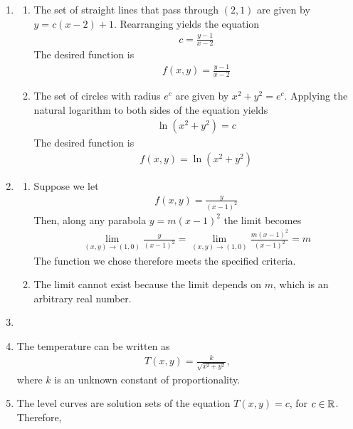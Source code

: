 \documentclass{article}
\begin{document}
\begin{enumerate}
\begin{enumerate}
\end{enumerate}
\item
\begin{enumerate}
\item The set of straight lines that pass through $(2,1)$ are given by $y = c(x-2) + 1$. Rearranging yields the equation 
\begin{align*}
c = \frac{y-1}{x-2}
\end{align*}
The desired function is 
\begin{align*}
f(x,y) = \frac{y-1}{x-2}
\end{align*}
\item The set of circles with radius $e^c$ are given by $x^2 + y^2 = e^c$. Applying the natural logarithm to both sides of the equation yields 
\begin{align*}
\ln(x^2+y^2) = c
\end{align*}
The desired function is 
\begin{align*}
f(x,y) =\ln(x^2+y^2)
\end{align*}\end{enumerate}
\item 
\begin{enumerate}
\item
Suppose we let 
\begin{align*}
f(x,y) = \frac{y}{(x-1)^2}
\end{align*}
Then, along any parabola $y = m(x-1)^2$ the limit becomes
\begin{align*}
\lim_{(x,y)\rightarrow(1,0) } \frac{y}{(x-1)^2} = \lim_{(x,y)\rightarrow(1,0) } \frac{m(x-1)^2}{(x-1)^2} = m
\end{align*}
The function we chose therefore meets the specified criteria.
\item
The limit cannot exist because the limit depends on $m$, which is an arbitrary real number.
\end{enumerate}
\item 
\BEN
\item The temperature can be written as 
\begin{align*}T(x,y) = \frac{k}{\sqrt{x^2 + y^2}},\end{align*} 
where $k$ is an unknown constant of proportionality.
\item The level curves are solution sets of the equation $T(x,y)=c$, for $c\in\mathbb{R}$. Therefore,

\end{enumerate}
\end{document}

